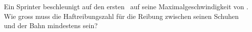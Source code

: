 Ein Sprinter beschleunigt auf den ersten \sSpO\ auf seine Maximalgeschwindigkeit von \vSpO. Wie gross muss die Haftreibungszahl für die Reibung zwischen seinen Schuhen und der Bahn mindestens sein?

